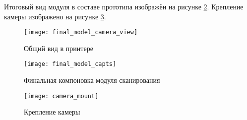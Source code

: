         Итоговый вид модуля в составе прототипа изображён на рисунке \ref{pic:final_model}. Крепление камеры изображено на рисунке \ref{pic:camera_mount}.

        \begin{figure}[H]
            \centering
            \texttt{[image: final\_model\_camera\_view]}
            \caption{Общий вид в принтере}
            \label{pic:final_model_camera_view}
        \end{figure}
        
        \begin{figure}[H]
            \centering
            \texttt{[image: final\_model\_capts]}
            \caption{Финальная компоновка модуля сканирования}
            \label{pic:final_model}
        \end{figure}
    
        \begin{figure}[H]
            \centering
            \texttt{[image: camera\_mount]}
            \caption{Крепление камеры}
            \label{pic:camera_mount}
        \end{figure}